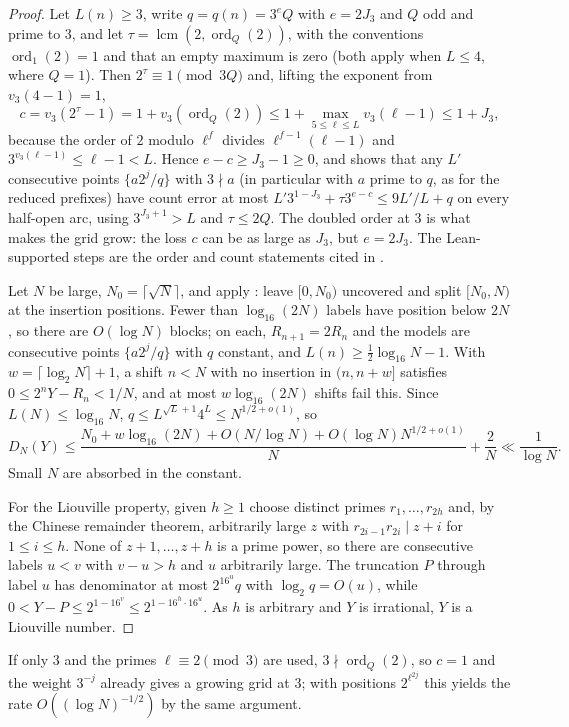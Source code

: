 \documentclass[11pt]{article}
\newcommand{\fr}[1]{\{#1\}}
\DeclareMathOperator{\ord}{ord}
\DeclareMathOperator{\lcm}{lcm}
\begin{document}
\begin{proof}
Let $L(n)\ge3$, write $q=q(n)=3^eQ$ with $e=2J_3$ and $Q$ odd and prime to $3$, and let
$\tau=\lcm(2,\ord_Q(2))$, with the conventions $\ord_1(2)=1$ and that an empty maximum is zero (both
apply when $L\le4$, where $Q=1$). Then $2^\tau\equiv1\pmod{3Q}$ and, lifting the exponent from $v_3(4-1)=1$,
\[
c=v_3(2^\tau-1)=1+v_3(\ord_Q(2))\le1+\max_{5\le\ell\le L}v_3(\ell-1)\le1+J_3,
\]
because the order of $2$ modulo $\ell^f$ divides $\ell^{f-1}(\ell-1)$ and $3^{v_3(\ell-1)}\le\ell-1<L$.
Hence $e-c\ge J_3-1\ge0$, and  shows that any $L'$ consecutive points $\fr{a2^j/q}$
with $3\nmid a$ (in particular with $a$ prime to $q$, as for the reduced prefixes) have count error at most $L'3^{1-J_3}+\tau3^{e-c}\le9L'/L+q$ on every half-open arc, using
$3^{J_3+1}>L$ and $\tau\le2Q$. The doubled order at $3$ is what makes the grid grow: the loss $c$ can be
as large as $J_3$, but $e=2J_3$. The Lean-supported steps are the order and count statements cited in
.

Let $N$ be large, $N_0=\lceil\sqrt N\rceil$, and apply : leave $[0,N_0)$ uncovered and
split $[N_0,N)$ at the insertion positions. Fewer than $\log_{16}(2N)$ labels have position below $2N$,
so there are $O(\log N)$ blocks; on each, $R_{n+1}=2R_n$ and the models are consecutive points
$\fr{a2^j/q}$ with $q$ constant, and $L(n)\ge\frac12\log_{16}N-1$. With $w=\lceil\log_2N\rceil+1$, a
shift $n<N$ with no insertion in $(n,n+w]$ satisfies $0\le2^nY-R_n<1/N$, and at most $w\log_{16}(2N)$
shifts fail this. Since $L(N)\le\log_{16}N$, $q\le L^{\sqrt L+1}4^L\le N^{1/2+o(1)}$, so
\[
D_N(Y)\le\frac{N_0+w\log_{16}(2N)+O(N/\log N)+O(\log N)N^{1/2+o(1)}}{N}+\frac2N\ll\frac1{\log N}.
\]
Small $N$ are absorbed in the constant.

For the Liouville property, given $h\ge1$ choose distinct primes $r_1,\ldots,r_{2h}$ and, by the Chinese
remainder theorem, arbitrarily large $z$ with $r_{2i-1}r_{2i}\mid z+i$ for $1\le i\le h$. None of
$z+1,\ldots,z+h$ is a prime power, so there are consecutive labels $u<v$ with $v-u>h$ and $u$
arbitrarily large. The truncation $P$ through label $u$ has denominator at most $2^{16^u}q$ with
$\log_2q=O(u)$, while $0<Y-P\le2^{1-16^v}\le2^{1-16^{h}\cdot16^u}$. As $h$ is arbitrary and $Y$ is
irrational, $Y$ is a Liouville number.
\end{proof}

If only $3$ and the primes $\ell\equiv2\pmod3$ are used, $3\nmid\ord_Q(2)$, so $c=1$ and the weight
$3^{-j}$ already gives a growing grid at $3$; with positions $2^{\ell^{2j}}$ this yields the rate
$O((\log N)^{-1/2})$ by the same argument.
\end{document}
